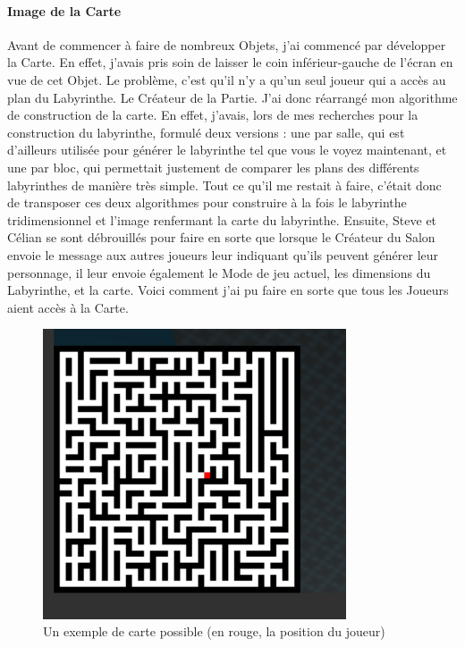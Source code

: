 \documentclass{article}
\begin{document}
\paragraph{Image de la Carte}
Avant de commencer à faire de nombreux Objets, j'ai commencé par développer la Carte. En effet, j'avais pris soin de laisser le coin inférieur-gauche de l'écran en vue de cet Objet. Le problème, c'est qu'il n'y a qu'un seul joueur qui a accès au plan du Labyrinthe. Le Créateur de la Partie. J'ai donc réarrangé mon algorithme de construction de la carte. En effet, j'avais, lors de mes recherches pour la construction du labyrinthe, formulé deux versions : une par salle, qui est d'ailleurs utilisée pour générer le labyrinthe tel que vous le voyez maintenant, et une par bloc, qui permettait justement de comparer les plans des différents labyrinthes de manière très simple. Tout ce qu'il me restait à faire, c'était donc de transposer ces deux algorithmes pour construire à la fois le labyrinthe tridimensionnel et l'image renfermant la carte du labyrinthe. Ensuite, Steve et Célian se sont débrouillés pour faire en sorte que lorsque le Créateur du Salon envoie le message aux autres joueurs leur indiquant qu'ils peuvent générer leur personnage, il leur envoie également le Mode de jeu actuel, les dimensions du Labyrinthe, et la carte. Voici comment j'ai pu faire en sorte que tous les Joueurs aient accès à la Carte.

\begin{figure}[H]
    \centering
    \includegraphics[width=0.8\textwidth]{Carte2020.png}
    \caption{Un exemple de carte possible (en rouge, la position du joueur)}
    \label{Un exemple de carte possible (en rouge, la position du joueur)}
\end{figure}
\end{document}
